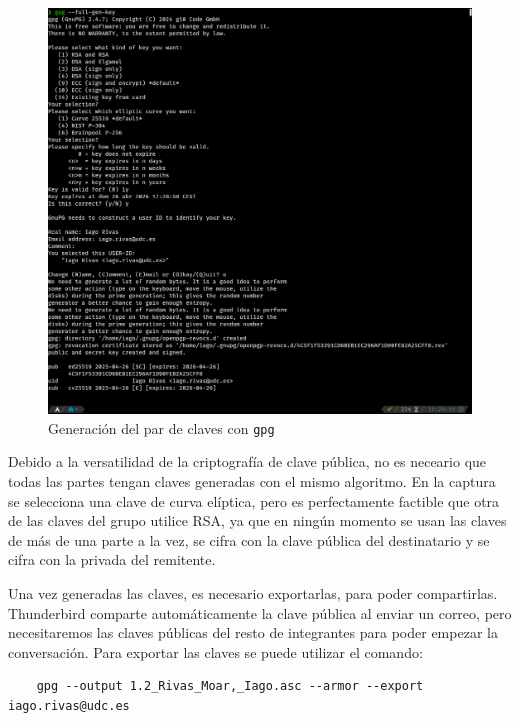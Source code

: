 \begin{figure}[H]
    \centering
    \includegraphics[width=\textwidth]{gpg-genkey.png}
    \caption{Generación del par de claves con \texttt{gpg}}
    \label{fig:generacion-claves}
\end{figure}

Debido a la versatilidad de la criptografía de clave pública, no es neceario que todas las partes tengan claves generadas con el mismo algoritmo. En la captura se selecciona una clave de curva elíptica, pero es perfectamente factible que otra de las claves del grupo utilice RSA, ya que en ningún momento se usan las claves de más de una parte a la vez, se cifra con la clave pública del destinatario y se cifra con la privada del remitente.

Una vez generadas las claves, es necesario exportarlas, para poder compartirlas. Thunderbird comparte automáticamente la clave pública al enviar un correo, pero necesitaremos las claves públicas del resto de integrantes para poder empezar la conversación. Para exportar las claves se puede utilizar el comando:

\begin{verbatim}
    gpg --output 1.2_Rivas_Moar,_Iago.asc --armor --export iago.rivas@udc.es
\end{verbatim}

